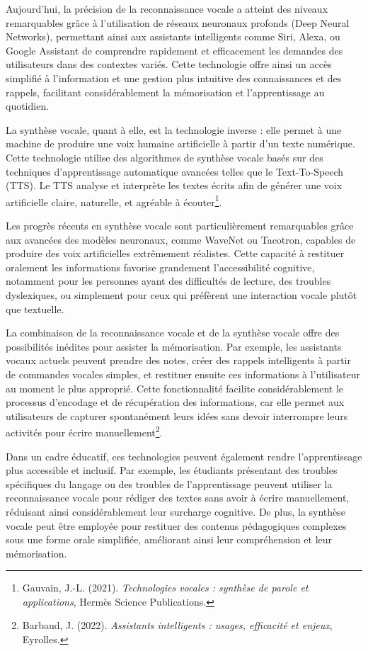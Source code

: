 \documentclass[11pt,a4paper]{report}
\begin{document}
Aujourd’hui, la précision de la reconnaissance vocale a atteint des niveaux remarquables grâce à l’utilisation de réseaux neuronaux profonds (Deep Neural Networks), permettant ainsi aux assistants intelligents comme Siri, Alexa, ou Google Assistant de comprendre rapidement et efficacement les demandes des utilisateurs dans des contextes variés. Cette technologie offre ainsi un accès simplifié à l’information et une gestion plus intuitive des connaissances et des rappels, facilitant considérablement la mémorisation et l’apprentissage au quotidien.

La synthèse vocale, quant à elle, est la technologie inverse : elle permet à une machine de produire une voix humaine artificielle à partir d’un texte numérique. Cette technologie utilise des algorithmes de synthèse vocale basés sur des techniques d’apprentissage automatique avancées telles que le Text-To-Speech (TTS). Le TTS analyse et interprète les textes écrits afin de générer une voix artificielle claire, naturelle, et agréable à écouter\footnote{Gauvain, J.-L. (2021). \textit{Technologies vocales : synthèse de parole et applications}, Hermès Science Publications.}.

Les progrès récents en synthèse vocale sont particulièrement remarquables grâce aux avancées des modèles neuronaux, comme WaveNet ou Tacotron, capables de produire des voix artificielles extrêmement réalistes. Cette capacité à restituer oralement les informations favorise grandement l’accessibilité cognitive, notamment pour les personnes ayant des difficultés de lecture, des troubles dyslexiques, ou simplement pour ceux qui préfèrent une interaction vocale plutôt que textuelle.

La combinaison de la reconnaissance vocale et de la synthèse vocale offre des possibilités inédites pour assister la mémorisation. Par exemple, les assistants vocaux actuels peuvent prendre des notes, créer des rappels intelligents à partir de commandes vocales simples, et restituer ensuite ces informations à l’utilisateur au moment le plus approprié. Cette fonctionnalité facilite considérablement le processus d’encodage et de récupération des informations, car elle permet aux utilisateurs de capturer spontanément leurs idées sans devoir interrompre leurs activités pour écrire manuellement\footnote{Barbaud, J. (2022). \textit{Assistants intelligents : usages, efficacité et enjeux}, Eyrolles.}.

Dans un cadre éducatif, ces technologies peuvent également rendre l’apprentissage plus accessible et inclusif. Par exemple, les étudiants présentant des troubles spécifiques du langage ou des troubles de l’apprentissage peuvent utiliser la reconnaissance vocale pour rédiger des textes sans avoir à écrire manuellement, réduisant ainsi considérablement leur surcharge cognitive. De plus, la synthèse vocale peut être employée pour restituer des contenus pédagogiques complexes sous une forme orale simplifiée, améliorant ainsi leur compréhension et leur mémorisation.
\end{document}

